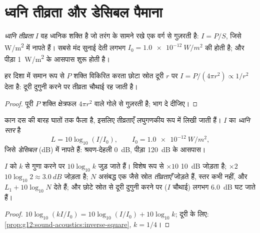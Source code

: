 \section{ध्वनि तीव्रता और डेसिबल पैमाना}

\begin{definition}[ध्वनि तीव्रता]\label{def:g12:sound-acoustics:intensity}
\emph{ध्वनि तीव्रता} $I$ वह ध्वनिक शक्ति है
जो तरंग के सामने रखे एक वर्ग  से गुज़रती है: $I = P/S$,
जिसे \unit{W/m^2} में नापते हैं। सबसे मंद सुनाई देती  लगभग $I_0 = \qty{1.0e-12}{W/m^2}$ की
होती है; और पीड़ा \qty{1}{W/m^2} के आसपास शुरू होती है।
\end{definition}

\begin{proposition}[व्युत्क्रम-वर्ग क्षीणन]\label{prop:g12:sound-acoustics:inverse-square}
%
हर दिशा में समान रूप से $P$ शक्ति विकिरित करता छोटा स्रोत दूरी
$r$ पर $I = P/(4\pi r^2) \propto 1/r^2$ देता है: दूरी दुगुनी करने पर तीव्रता चौथाई रह जाती है।
\end{proposition}

\begin{proof}
पूरी $P$ शक्ति क्षेत्रफल $4\pi r^2$ वाले गोले से गुज़रती है; भाग दे
दीजिए।
\end{proof}

\begin{definition}[ध्वनि स्तर]\label{def:g12:sound-acoustics:level}
कान दस की बारह घातों तक फैला है, इसलिए तीव्रताएँ लघुगणकीय रूप में
लिखी जाती हैं। $I$ का \emph{ध्वनि स्तर} है
\[ L = 10 \log_{10}(I/I_0), \qquad I_0 = \qty{1.0e-12}{W/m^2}, \]
जिसे \emph{डेसिबल} (\unit{dB}) में नापते हैं: श्रवण-देहली
\qty{0}{dB}, पीड़ा \qty{120}{dB} के आसपास।
\end{definition}

\begin{proposition}[डेसिबल का गणित]\label{prop:g12:sound-acoustics:db-arithmetic}
$I$ को $k$ से गुणा करने पर $10\log_{10}k$  जुड़ जाते हैं। विशेष
रूप से $\times 10$ \qty{10}{dB} जोड़ता है; $\times 2$ $10\log_{10}2 \approx \qty{3.0}{dB}$ जोड़ता है; $N$ असंबद्ध एक
जैसे स्रोत \emph{तीव्रताएँ} जोड़ते हैं, स्तर कभी नहीं, और $L_1 + 10\log_{10}N$ देते हैं;
और छोटे स्रोत से दूरी दुगुनी करने पर ($I$ चौथाई) लगभग \qty{6.0}{dB} घट जाते हैं।
\end{proposition}

\begin{proof}
$10\log_{10}(kI/I_0) = 10\log_{10}(I/I_0) + 10\log_{10}k$; दूरी के लिए: \cref{prop:g12:sound-acoustics:inverse-square}, $k = 1/4$।
\end{proof}

